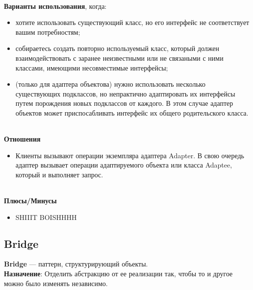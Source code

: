 \documentclass[a3paper,11pt]{report}
\begin{document}
\large\textbf{\\Варианты использования}, когда:
\begin{itemize}
\item хотите использовать существующий класс, но его интерфейс не соответствует вашим потребностям;
\item собираетесь создать повторно используемый класс, который должен взаимодействовать с заранее неизвестными или не связаными с ними классами, имеющими несовместимые интерфейсы;
\item (только для адаптера объектова) нужно использовать несколько существующих подклассов, но непрактично адаптировать их интерфейсы путем порождения новых подклассов от каждого. В этом случае адаптер объектов может приспосабливать интерфейс их общего родительского класса.
\end{itemize}

\textbf{\\Отношения}
\begin{itemize}
\item Клиенты вызывают операции экземпляра адаптера Adapter. В свою очередь адаптер вызывает операции  адаптируемого объекта или класса Adaptee, который и выполняет запрос.
\end{itemize}

\textbf{\\Плюсы/Минусы}
\begin{itemize}
\item [] SHIIIT BOISHHHH
\end{itemize}


\newpage
\subsection{Bridge}

\large\textbf{Bridge} --- паттерн, структурирующий объекты.
\\
\large\textbf{Назначение}: Отделить абстракцию от ее реализации так, чтобы то и другое можно было изменять независимо.
\\
\end{document}
